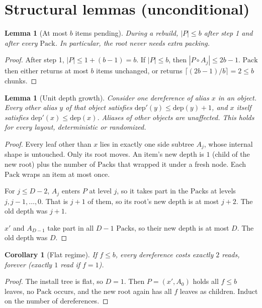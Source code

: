 \documentclass[11pt]{article}
\newtheorem{lemma}[theorem]{Lemma}
\newtheorem{corollary}[theorem]{Corollary}
\theoremstyle{definition}
\newcommand{\dep}{\mathrm{dep}}
\begin{document}
\section{Structural lemmas (unconditional)}

\begin{lemma}[At most $b$ items pending]\label{lem:pending}
During a rebuild, $|P|\le b$ after step 1 and after every $\mathrm{Pack}$. In
particular, the root never needs extra packing.
\end{lemma}
\begin{proof}
After step 1, $|P|\le 1+(b-1)=b$. If $|P|\le b$, then $|P\circ A_j|\le 2b-1$.
$\mathrm{Pack}$ then either returns at most $b$ items unchanged, or returns
$\lceil (2b-1)/b\rceil = 2\le b$ chunks.
\end{proof}

\begin{lemma}[Unit depth growth]\label{lem:growth}
Consider one dereference of alias $x$ in an object. Every other alias $y$ of
that object satisfies $\dep'(y)\le \dep(y)+1$, and $x$ itself satisfies
$\dep'(x)\le\dep(x)$. Aliases of other objects are unaffected. This holds for
every layout, deterministic or randomized.
\end{lemma}
\begin{proof}
Every leaf other than $x$ lies in exactly one side subtree $A_j$, whose
internal shape is untouched. Only its root moves. An item's new depth is $1$
(child of the new root) plus the number of $\mathrm{Pack}$s that wrapped it
under a fresh node. Each $\mathrm{Pack}$ wraps an item at most once.

For $j\le D-2$, $A_j$ enters $P$ at level $j$, so it takes part in the
$\mathrm{Pack}$s at levels $j,j-1,\dots,0$. That is $j+1$ of them, so its
root's new depth is at most $j+2$. The old depth was $j+1$.

$x'$ and $A_{D-1}$ take part in all $D-1$ $\mathrm{Pack}$s, so their new depth
is at most $D$. The old depth was $D$.
\end{proof}

\begin{corollary}[Flat regime]\label{cor:flat}
If $f\le b$, every dereference costs exactly $2$ reads, forever (exactly $1$
read if $f=1$).
\end{corollary}
\begin{proof}
The install tree is flat, so $D=1$. Then $P=(x',A_0)$ holds all $f\le b$
leaves, no $\mathrm{Pack}$ occurs, and the new root again has all $f$ leaves as
children. Induct on the number of dereferences.
\end{proof}
\end{document}
